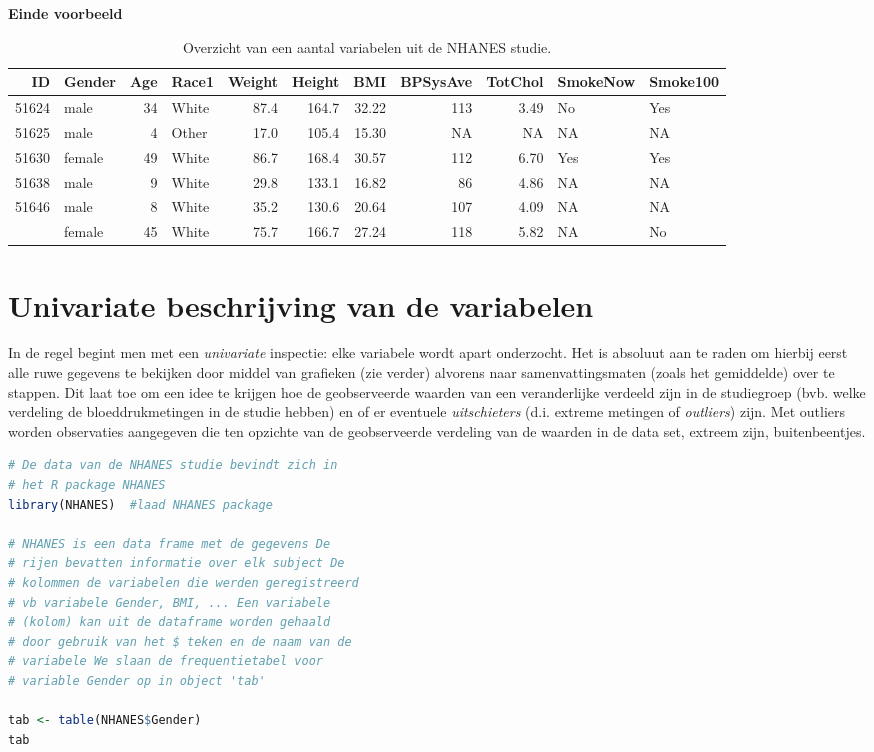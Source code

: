 \documentclass[
  12pt,dutch,coursenotes]{book}
\begin{document}
\textbf{Einde voorbeeld}

\begin{table}

\caption{\label{tab:nhanesDatExpl}Overzicht van een aantal variabelen uit de NHANES studie.}
\centering
\begin{tabular}[t]{rlrlrrrrrll}
\toprule
ID & Gender & Age & Race1 & Weight & Height & BMI & BPSysAve & TotChol & SmokeNow & Smoke100\\
\midrule
51624 & male & 34 & White & 87.4 & 164.7 & 32.22 & 113 & 3.49 & No & Yes\\
51625 & male & 4 & Other & 17.0 & 105.4 & 15.30 & NA & NA & NA & NA\\
51630 & female & 49 & White & 86.7 & 168.4 & 30.57 & 112 & 6.70 & Yes & Yes\\
51638 & male & 9 & White & 29.8 & 133.1 & 16.82 & 86 & 4.86 & NA & NA\\
51646 & male & 8 & White & 35.2 & 130.6 & 20.64 & 107 & 4.09 & NA & NA\\
\addlinespace
51647 & female & 45 & White & 75.7 & 166.7 & 27.24 & 118 & 5.82 & NA & No\\
\bottomrule
\end{tabular}
\end{table}

\hypertarget{sec:univar}{%
\section{Univariate beschrijving van de variabelen}\label{sec:univar}}

In de regel begint men met een \emph{univariate} inspectie: elke variabele
wordt apart onderzocht. Het is absoluut aan te raden om hierbij eerst alle
ruwe gegevens te bekijken door middel van grafieken (zie verder) alvorens
naar samenvattingsmaten (zoals het gemiddelde) over te stappen. Dit laat toe
om een idee te krijgen hoe de geobserveerde waarden van een veranderlijke
verdeeld zijn in de studiegroep (bvb. welke verdeling de bloeddrukmetingen in de studie hebben)
en of er eventuele \emph{uitschieters} (d.i. extreme
metingen of \emph{outliers}) zijn. Met outliers worden observaties
aangegeven die ten opzichte van de geobserveerde verdeling van de waarden in
de data set, extreem zijn, buitenbeentjes.

\begin{lstlisting}[language=R]
# De data van de NHANES studie bevindt zich in
# het R package NHANES
library(NHANES)  #laad NHANES package

# NHANES is een data frame met de gegevens De
# rijen bevatten informatie over elk subject De
# kolommen de variabelen die werden geregistreerd
# vb variabele Gender, BMI, ... Een variabele
# (kolom) kan uit de dataframe worden gehaald
# door gebruik van het $ teken en de naam van de
# variabele We slaan de frequentietabel voor
# variable Gender op in object 'tab'

tab <- table(NHANES$Gender)
tab
\end{lstlisting}
\end{document}
